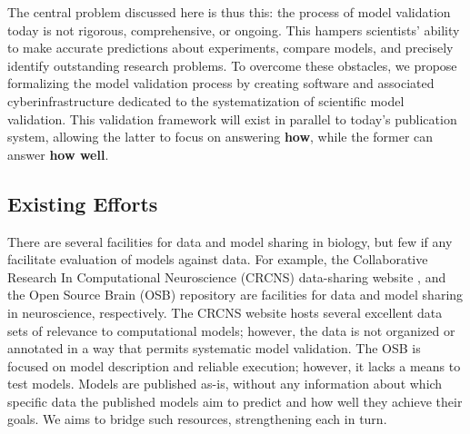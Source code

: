 \documentclass[11pt,letterpaper]{article}
\begin{document}
The central problem discussed here is thus this: the process of model validation today is not rigorous, comprehensive, or ongoing. This hampers scientists' ability to make accurate predictions about experiments, compare models, and precisely identify outstanding research problems. To overcome these obstacles, we propose formalizing the model validation process by creating software and associated cyberinfrastructure dedicated to the systematization of scientific model validation.  This validation framework will exist in parallel to today's publication system, allowing the latter to focus on answering \textbf{how}, while the former can answer \textbf{how well}. 

\subsection{Existing Efforts}\label{sec:existing_efforts}
There are several facilities for data and model sharing in biology, but few if any facilitate evaluation of models against data.  For example, the Collaborative Research In Computational Neuroscience (CRCNS) data-sharing website \cite{crcns_url}, and the Open Source Brain (OSB) repository \cite{osb_url} are facilities for data and model sharing in neuroscience, respectively.  The CRCNS website hosts several excellent data sets of relevance to computational models; however, the data is not organized or annotated in a way that permits systematic model validation.  The OSB is focused on model description and reliable execution; however, it lacks a means to test models. Models are published as-is, without any information about which specific data the published models aim to predict and how well they achieve their goals. We aims to bridge such resources, strengthening each in turn.
\end{document}
